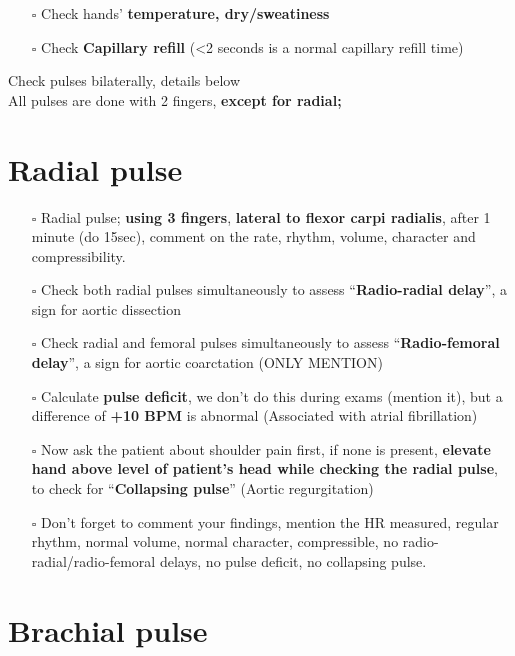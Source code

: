 \documentclass[
  13.5pt,
  a4paper,
  DIV=11,
  numbers=noendperiod]{scrreprt}
\providecommand{\tightlist}{%
  \setlength{\itemsep}{0pt}\setlength{\parskip}{0pt}}
\begin{document}
\begin{itemize}
\tightlist
\item[$\square$]
  Check hands' \textbf{temperature, dry/sweatiness}
\item[$\square$]
  Check \textbf{Capillary refill} (\textless2 seconds is a normal
  capillary refill time)
\end{itemize}

Check pulses bilaterally, details below\\
All pulses are done with 2 fingers, \textbf{except for radial;}

\section{Radial pulse}\label{radial-pulse}

\begin{itemize}
\tightlist
\item[$\square$]
  Radial pulse; \textbf{using 3 fingers}, \textbf{lateral to flexor
  carpi radialis}, after 1 minute (do 15sec), comment on the rate,
  rhythm, volume, character and compressibility.
\item[$\square$]
  Check both radial pulses simultaneously to assess
  ``\textbf{Radio-radial delay}'', a sign for aortic dissection
\item[$\square$]
  Check radial and femoral pulses simultaneously to assess
  ``\textbf{Radio-femoral delay}'', a sign for aortic coarctation (ONLY
  MENTION)
\item[$\square$]
  Calculate \textbf{pulse deficit}, we don't do this during exams
  (mention it), but a difference of \textbf{+10 BPM} is abnormal
  (Associated with atrial fibrillation)
\item[$\square$]
  Now ask the patient about shoulder pain first, if none is present,
  \textbf{elevate hand above level of patient's head while checking the
  radial pulse}, to check for ``\textbf{Collapsing pulse}'' (Aortic
  regurgitation)
\item[$\square$]
  Don't forget to comment your findings, mention the HR measured,
  regular rhythm, normal volume, normal character, compressible, no
  radio-radial/radio-femoral delays, no pulse deficit, no collapsing
  pulse.
\end{itemize}

\section{Brachial pulse}\label{brachial-pulse}
\end{document}
